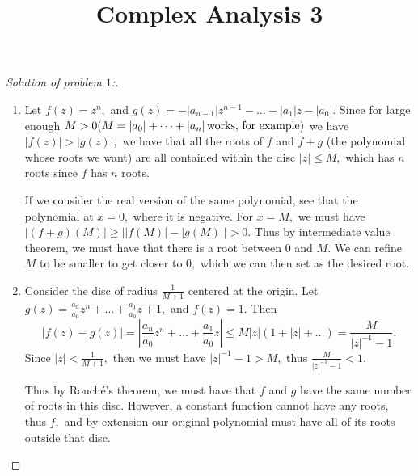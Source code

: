 \documentclass[letterpaper,11pt,twoside]{article}
\title{Complex  Analysis 3}
\theoremstyle{proposition}
\theoremstyle{definition}
\theoremstyle{theorem}
\theoremstyle{definition}
\theoremstyle{definition}
\theoremstyle{definition}
\theoremstyle{lemma}
\theoremstyle{definition}
\theoremstyle{definition}
\theoremstyle{corollary}
\theoremstyle{definition}
\theoremstyle{definition}
\theoremstyle{definition}
\newcommand{\abs}[1]{\left \vert #1 \right \vert}
\newcommand{\type}[1]{\text{\rm #1}}
\begin{document}
	\maketitle
	\begin{proof}[Solution of problem $1$:]
		\begin{enumerate}
			\item Let $f(z)= z^n,$ and $g(z)= -\abs{a_{n-1}}z^{n-1} - \dots - \abs{a_1}z - \abs{a_0}.$ Since for large enough $M>0 (M= \abs{a_0}+ \dots + 
			\abs{a_n} \type{ works, for example})$ we have $|f(z)| > 
			\abs{g(z)},$ we have that all the roots of $f$ and $f+g$ (the polynomial whose roots we want) are all contained within the disc $\abs{z} \leq 
			M,$ which has $n$ roots since $f$ has $n$ roots. 
			
			If we consider the real version of the same polynomial, see that the polynomial at $x=0,$ where it is negative. For $x=M,$ we must have 
			$\abs{(f+g)(M)} \geq \abs{\abs{f(M)}-\abs{g(M)}} > 0.$ Thus by intermediate value theorem, we must have that there is a root between $0$ and 
			$M.$ 
			We can refine $M$ to be smaller to get closer to $0,$ which we can then set as the desired root. 
			\item Consider the disc of radius $\frac{1}{M+1}$ centered at the origin. Let $g(z)= \frac{a_n}{a_0}z^n + \dots + \frac{a_1}{a_0}z+1,$ and $f(z) 
			=1.$ Then $$ \abs{f(z)-g(z)}= \abs{\frac{a_n}{a_0}z^n + \dots + \frac{a_1}{a_0}z } \leq M \abs{z} (1+\abs{z}+ \dots) = \frac{M}{ 
			\abs{z}^{-1}-1}.$$ 
			Since $\abs{z} < \frac{1}{M+1},$ then we must have $\abs{z}^{-1}-1 > M,$ thus $ \frac{M}{ \abs{z}^{-1}-1} < 1. $ 
			
			Thus by Rouch\'{e}'s theorem, we must have that $f$ and $g$ have the same number of roots in this disc. However, a constant function cannot 
			have any roots, thus $f,$ and by extension our original polynomial must have all of its roots outside that disc. 
		\end{enumerate}
	\end{proof}
\end{document}
